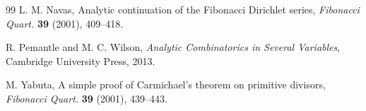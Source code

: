 \documentclass[11pt, a4paper]{article}
\theoremstyle{plain}
\theoremstyle{definition}
\begin{document}
\begin{thebibliography}{99}
L. M. Navas, 
Analytic continuation of the Fibonacci Dirichlet series, 
\textit{Fibonacci Quart.} \textbf{39} (2001), 409--418.

R. Pemantle and M. C. Wilson, %
\textit{Analytic Combinatorics in Several Variables},
Cambridge University Press, 2013.
% 



M. Yabuta, 
A simple proof of Carmichael's theorem on primitive divisors,
\textit{Fibonacci Quart.} \textbf{39} (2001), 439--443. %

\end{thebibliography}

\end{document}
